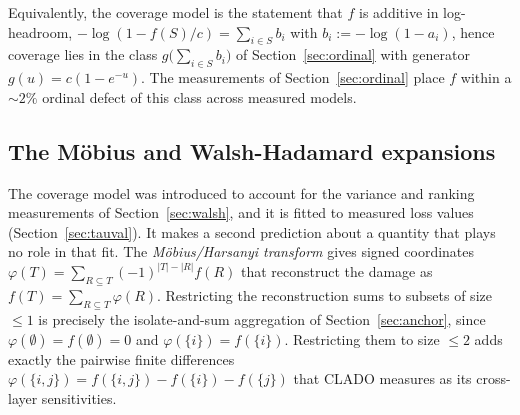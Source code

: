 Equivalently, the coverage model is the statement that $f$ is additive in log-headroom,
$-\log(1-f(S)/c) = \sum_{i\in S} b_i$ with $b_i:=-\log(1-a_i)$, hence coverage lies in the class
$g\bigl(\sum_{i\in S} b_i\bigr)$ of Section~\ref{sec:ordinal} with generator $g(u)=c(1-e^{-u})$. 
The measurements of Section~\ref{sec:ordinal} place $f$ within a ${\sim}2\%$
ordinal defect of this class across measured models. 


\subsection{The M\"obius and Walsh-Hadamard expansions}\label{sec:duality}

The coverage model was introduced to account for the variance and ranking measurements of
Section~\ref{sec:walsh}, and it is fitted to measured loss values (Section~\ref{sec:tauval}). It makes
a second prediction about a quantity that plays no role in that fit. The \emph{M\"obius/Harsanyi
transform} gives signed coordinates $\varphi(T)=\sum_{R\subseteq T}(-1)^{|T|-|R|}f(R)$ that
reconstruct the damage as $f(T) = \sum_{R \subseteq T} \varphi(R)$. 
Restricting the reconstruction sums to subsets of size $\le 1$
is precisely the isolate-and-sum aggregation of Section~\ref{sec:anchor}, since
$\varphi(\emptyset) = f(\emptyset) = 0$ and $\varphi(\{i\}) = f(\{i\})$. Restricting them to size
$\le 2$ adds exactly the pairwise finite differences
$\varphi(\{i,j\}) = f(\{i,j\}) - f(\{i\}) - f(\{j\})$ that CLADO \citep{clado2023} measures as its
cross-layer sensitivities.

